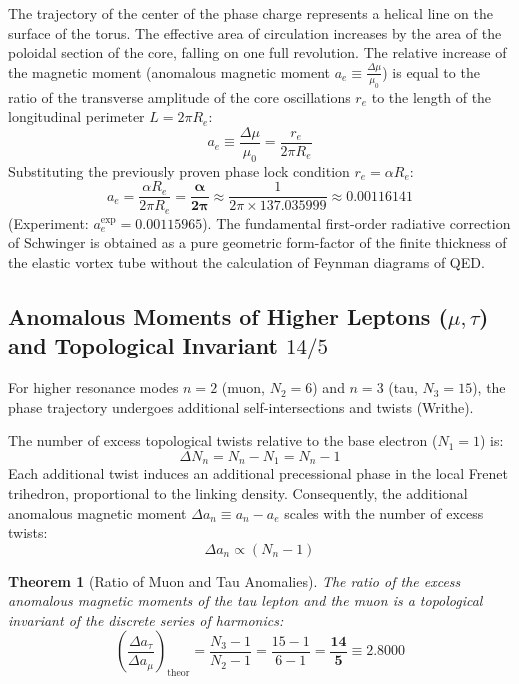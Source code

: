 \documentclass[12pt,a4paper]{article}
\newtheorem{theorem}{Theorem}
\begin{document}
	The trajectory of the center of the phase charge represents a helical line on the surface of the torus. The effective area of circulation increases by the area of the poloidal section of the core, falling on one full revolution. 
	The relative increase of the magnetic moment (anomalous magnetic moment $a_e \equiv \frac{\Delta \mu}{\mu_0}$) is equal to the ratio of the transverse amplitude of the core oscillations $r_e$ to the length of the longitudinal perimeter $L = 2\pi R_e$:
	\begin{equation}
		a_e \equiv \frac{\Delta \mu}{\mu_0} = \frac{r_e}{2\pi R_e}
	\end{equation}
	Substituting the previously proven phase lock condition $r_e = \alpha R_e$:
	\begin{equation}
		a_e = \frac{\alpha R_e}{2\pi R_e} = \mathbf{\frac{\alpha}{2\pi}} \approx \frac{1}{2\pi \times 137.035999} \approx \mathbf{0.00116141}
	\end{equation}
	(Experiment: $a_e^{\text{exp}} = 0.00115965$). The fundamental first-order radiative correction of Schwinger is obtained as a pure geometric form-factor of the finite thickness of the elastic vortex tube without the calculation of Feynman diagrams of QED.
	
	\subsection{Anomalous Moments of Higher Leptons ($\mu, \tau$)\\ and Topological Invariant $14/5$}
	For higher resonance modes $n=2$ (muon, $N_2=6$) and $n=3$ (tau, $N_3=15$), the phase trajectory undergoes additional self-intersections and twists (Writhe). 
	
	The number of excess topological twists relative to the base electron ($N_1=1$) is:
	\begin{equation}
		\Delta N_n = N_n - N_1 = N_n - 1
	\end{equation}
	Each additional twist induces an additional precessional phase in the local Frenet trihedron, proportional to the linking density. Consequently, the additional anomalous magnetic moment $\Delta a_n \equiv a_n - a_e$ scales with the number of excess twists:
	\begin{equation}
		\Delta a_n \propto (N_n - 1)
	\end{equation}
	
	\begin{theorem}[Ratio of Muon and Tau Anomalies]
		The ratio of the excess anomalous magnetic moments of the tau lepton and the muon is a topological invariant of the discrete series of harmonics:
		\begin{equation}
			\left( \frac{\Delta a_\tau}{\Delta a_\mu} \right)_{\mathrm{theor}} = \frac{N_3 - 1}{N_2 - 1} = \frac{15 - 1}{6 - 1} = \mathbf{\frac{14}{5} \equiv 2.8000}
		\end{equation}
	\end{theorem}
	
\end{document}
